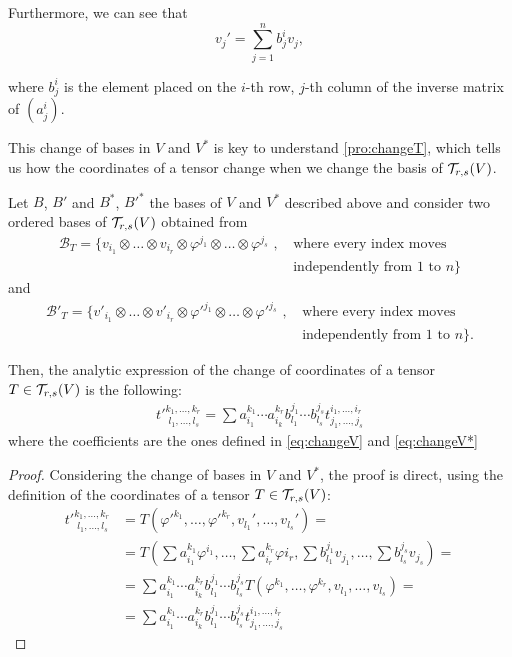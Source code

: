 Furthermore, we can see that
\begin{equation}
	\label{eq:changeV}
	v_j' = \sum_{j=1}^n b_j^i v_j,
\end{equation}

where $b_j^i$ is the element placed on the $i$-th row, $j$-th column of  the inverse matrix of $(a^i_j)$.

This change of bases in $V$ and $V^*$  is key to understand \autoref{pro:changeT}, which tells us how  the coordinates of a tensor change when we change the basis of ${\mathcal T}_{r,s}(V)$.

\begin{proposition}
	\label{pro:changeT}
	Let $B$, $B'$ and $B^*$, $B'^*$ the bases of $V$ and $V^*$ described above and consider two ordered bases of ${\mathcal T}_{r,s}(V)$ obtained from
	\begin{align*}
		\mathcal{B}_T = \{v_{i_1} \otimes \dots \otimes v_{i_r} \otimes \varphi^{j_1} \otimes \dots \otimes \varphi^{j_s} \textrm{ , } &\textrm{where every index moves} \\
		&\textrm{independently from $1$ to $n$}  \}
	\end{align*}
	and
	\begin{align*}
		\mathcal{B}'_T = \{v'_{i_1} \otimes \dots \otimes v'_{i_r} \otimes \varphi'^{j_1} \otimes \dots \otimes \varphi'^{j_s} \textrm{ , } &\textrm{where every index moves} \\
		&\textrm{independently from $1$ to $n$}  \}.
	\end{align*}

	Then, the analytic expression of the change of coordinates of a tensor $T \in {\mathcal T}_{r,s}(V)$ is the following:
	\begin{align*}
		t'^{k_1,\dots,k_r}_{\phantom{'}l_1,\dots,l_s} = \sum a_{i_1}^{k_1} \cdots a_{i_k}^{k_r} b_{l_1}^{j_1} \cdots b_{l_s}^{j_s} t_{j_1,\dots,j_s}^{i_1,\dots,i_r}
	\end{align*}
	where the coefficients are the ones defined in \autoref{eq:changeV} and \autoref{eq:changeV*}
\end{proposition}

\begin{proof}
	Considering the change of bases in $V$ and $V^*$, the proof is direct, using the definition of the coordinates of a tensor $T \in {\mathcal T}_{r,s}(V)$:
	\begin{align*}
		t'^{k_1,\dots,k_r}_{\phantom{'}l_1,\dots,l_s} &= T(\varphi'^{k_1}, \dots, \varphi'^{k_r}, v_{l_1}', \dots, v_{l_s}')  = \\
		&= T(\sum a_{i_1}^{k_1}\varphi^{i_1}, \dots, \sum a_{i_r}^{k_r}\varphi{i_r}, \sum b_{l_1}^{j_1} v_{j_1}, \dots, \sum b_{l_s}^{j_s} v_{j_s}) = \\
		&= \sum a_{i_1}^{k_1} \cdots a_{i_k}^{k_r} b_{l_1}^{j_1} \cdots b_{l_s}^{j_s} T(\varphi^{k_1}, \dots, \varphi^{k_r}, v_{l_1}, \dots, v_{l_s}) = \\
		&= \sum a_{i_1}^{k_1} \cdots a_{i_k}^{k_r} b_{l_1}^{j_1} \cdots b_{l_s}^{j_s} t_{j_1,\dots,j_s}^{i_1,\dots,i_r}
	\end{align*}
\end{proof}

